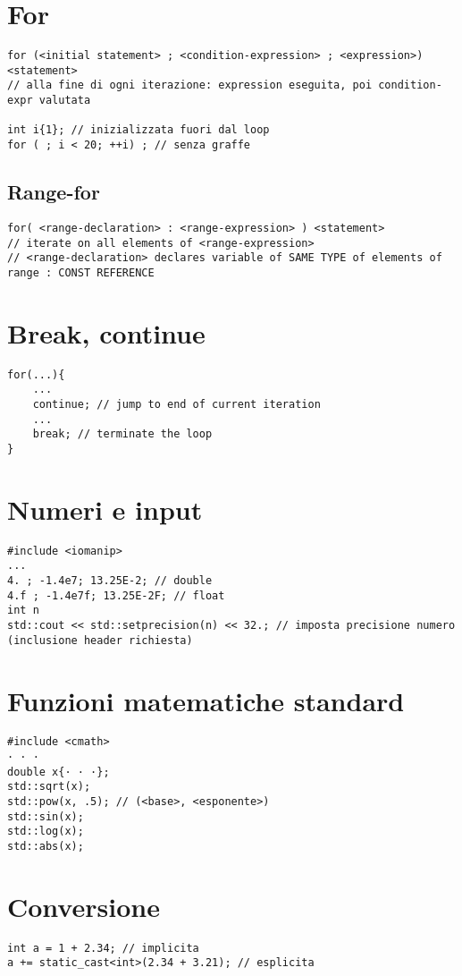 \documentclass[10pt, oneside]{Book}
\begin{document}
\section{For}
\begin{verbatim}
for (<initial statement> ; <condition-expression> ; <expression>) <statement>
// alla fine di ogni iterazione: expression eseguita, poi condition-expr valutata

int i{1}; // inizializzata fuori dal loop
for ( ; i < 20; ++i) ; // senza graffe
\end{verbatim}
\subsection{Range-for}
\begin{verbatim}
for( <range-declaration> : <range-expression> ) <statement>
// iterate on all elements of <range-expression>
// <range-declaration> declares variable of SAME TYPE of elements of range : CONST REFERENCE
\end{verbatim}

\section{Break, continue}
\begin{verbatim}
for(...){
    ...
    continue; // jump to end of current iteration
    ...
    break; // terminate the loop
}
\end{verbatim}

\section{Numeri e input}
\begin{verbatim}
#include <iomanip>
... 
4. ; -1.4e7; 13.25E-2; // double
4.f ; -1.4e7f; 13.25E-2F; // float
int n
std::cout << std::setprecision(n) << 32.; // imposta precisione numero (inclusione header richiesta)
\end{verbatim}

\section{Funzioni matematiche standard}
\begin{verbatim}
#include <cmath>
· · ·
double x{· · ·};
std::sqrt(x);
std::pow(x, .5); // (<base>, <esponente>)
std::sin(x);
std::log(x);
std::abs(x);
\end{verbatim}

\section{Conversione}
\begin{verbatim}
int a = 1 + 2.34; // implicita
a += static_cast<int>(2.34 + 3.21); // esplicita
\end{verbatim}
\end{document}

